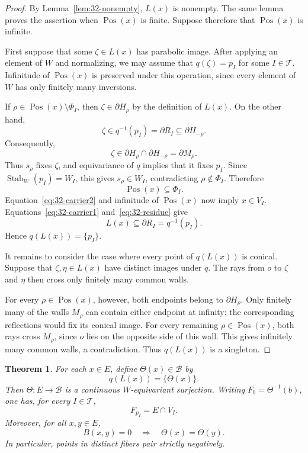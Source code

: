 \documentclass[11pt,reqno]{amsart}
\DeclareMathOperator{\Stab}{Stab}
\theoremstyle{plain}
\newtheorem{theorem}{Theorem}[section]
\theoremstyle{definition}
\theoremstyle{remark}
\numberwithin{equation}{section}
\DeclareMathOperator{\Pos}{Pos}
\begin{document}
\begin{proof}
By Lemma~\ref{lem:32-nonempty}, $L(x)$ is nonempty.
The same lemma proves the assertion when $\Pos(x)$ is finite.
Suppose therefore that $\Pos(x)$ is infinite.

First suppose that some $\zeta\in L(x)$ has parabolic image.
After applying an element of $W$ and normalizing, we may
assume that $q(\zeta)=p_I$ for some $I\in\mathcal T$.
Infinitude of $\Pos(x)$ is preserved under this operation,
since every element of $W$ has only finitely many inversions.

If $\rho\in\Pos(x)\setminus\Phi_I$, then
$\zeta\in\partial H_\rho$ by the definition of $L(x)$.
On the other hand,
\[
    \zeta\in q^{-1}(p_I)=\partial R_I
    \subseteq\partial H_{-\rho}.
\]
Consequently,
\[
    \zeta\in
    \partial H_\rho\cap\partial H_{-\rho}
    =\partial M_\rho.
\]
Thus $s_\rho$ fixes $\zeta$, and equivariance of $q$ implies
that it fixes $p_I$. Since $\Stab_W(p_I)=W_I$, this gives
$s_\rho\in W_I$, contradicting $\rho\notin\Phi_I$.
Therefore
\[
    \Pos(x)\subseteq\Phi_I.
\]
Equation~\eqref{eq:32-carrier2} and infinitude of $\Pos(x)$
now imply $x\in V_I$. Equations~\eqref{eq:32-carrier1}
and~\eqref{eq:32-residue} give
\[
    L(x)\subseteq\partial R_I=q^{-1}(p_I).
\]
Hence $q(L(x))=\{p_I\}$.

It remains to consider the case where every point of $q(L(x))$
is conical. Suppose that $\zeta,\eta\in L(x)$ have distinct
images under $q$. The rays from $o$ to $\zeta$ and $\eta$
then cross only finitely many common walls.

For every $\rho\in\Pos(x)$, however, both endpoints belong
to $\partial H_\rho$. Only finitely many of the walls
$M_\rho$ can contain either endpoint at infinity:
the corresponding reflections would fix its conical image.
For every remaining $\rho\in\Pos(x)$, both rays cross $M_\rho$,
since $o$ lies on the opposite side of this wall.
This gives infinitely many common walls, a contradiction.
Thus $q(L(x))$ is a singleton.
\end{proof}

\begin{theorem}\label{thm:32-boundary-map}
For each $x\in E$, define $\Theta(x)\in\mathcal B$ by
\[
    q(L(x))=\{\Theta(x)\}.
\]
Then $\Theta:E\to\mathcal B$ is a continuous
$W$-equivariant surjection. Writing $F_b=\Theta^{-1}(b)$,
one has, for every $I\in\mathcal T$,
\begin{equation}\label{eq:32-parabolic-fibers}
    F_{p_I}=E\cap V_I.
\end{equation}
Moreover, for all $x,y\in E$,
\begin{equation}\label{eq:32-orthogonal-code}
    B(x,y)=0
    \quad\Longrightarrow\quad
    \Theta(x)=\Theta(y).
\end{equation}
In particular, points in distinct fibers pair strictly negatively.
\end{theorem}
\end{document}
